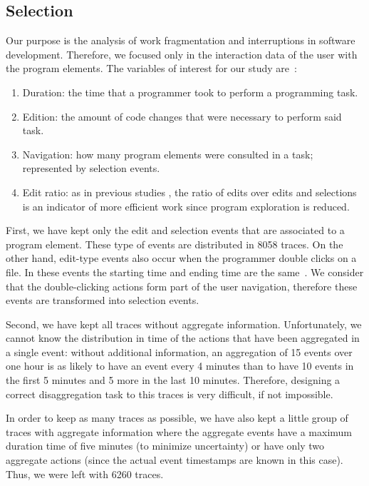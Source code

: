 \documentclass[times]{smrauth}
\begin{document}
\subsection{Selection}
Our purpose is the analysis of work fragmentation and interruptions in software development. Therefore, we focused only in the interaction data of the user with the program elements. The  variables of interest for our study are~\cite{RD13}:
\begin{enumerate}
\item Duration: the time that a programmer took to perform a programming task. 
\item Edition:  the amount of code changes that were necessary to perform said task. %
\item Navigation: how many program elements were consulted in a task; represented by selection events.
\item Edit ratio: as in previous studies \cite{KM06}, the ratio of edits over edits and selections is an indicator of more efficient work since program exploration is reduced.
\end{enumerate}

First, we have kept only the edit and selection events that are associated to a program element. These type of events are distributed in 8058 traces. On the other hand, edit-type events also occur when the programmer double clicks on a file. In these events the starting time and ending time are the same~\cite{LJD11}. We consider that the double-clicking actions form part of the user navigation, therefore these events are transformed into selection events.  

Second, we have kept all traces without aggregate information. Unfortunately, we cannot know the distribution in time of the actions that have been aggregated in a single event: without additional information, an aggregation of 15 events over one hour is as likely to have an event every 4 minutes than to have 10 events in the first 5 minutes and 5 more in the last 10 minutes. Therefore, designing a correct disaggregation task to this traces is very difficult, if not impossible.

In order to keep as many traces as possible, we have also kept a little group of traces with aggregate information where the aggregate events have a maximum duration time of five minutes (to minimize uncertainty) or have only two aggregate actions (since the actual event timestamps are known in this case). Thus, we were left with 6260 traces.
\end{document}
